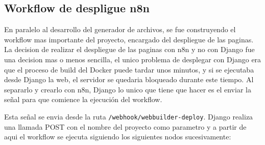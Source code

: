 \subsection{Workflow de despligue n8n}
\label{subsec:workflow-despliegue}

En paralelo al desarrollo del generador de archivos, se fue construyendo el workflow mas importante del proyecto, encargado del despliegue de las paginas.
La decision de realizar el despliegue de las paginas con n8n y no con Django fue una decision mas o menos sencilla, el unico problema de desplegar con Django era que el proceso
de build del Docker puede tardar unos minutos, y si se ejecutaba desde Django la web, el servidor se quedaria bloqueado durante este tiempo. Al separarlo y crearlo con n8n, Django lo unico que tiene que hacer es el enviar la señal para que comience la ejecución del workflow.

Esta señal se envia desde la ruta \texttt{/webhook/webbuilder-deploy}. Django realiza una llamada POST con el nombre del proyecto como parametro y a partir de aqui el workflow se ejecuta siguiendo los siguientes nodos sucesivamente:

